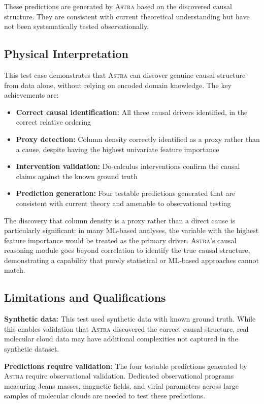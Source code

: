 \documentclass[fleqn,usenatbib]{mnras}
\newcommand{\astra}{\textsc{Astra}\xspace}
\begin{document}
These predictions are generated by \astra based on the discovered causal structure. They are consistent with current theoretical understanding but have not been systematically tested observationally.

\subsection{Physical Interpretation}
\label{sec:tc6:interpretation}

This test case demonstrates that \astra can discover genuine causal structure from data alone, without relying on encoded domain knowledge.
The key achievements are:
\begin{itemize}
  \item \textbf{Correct causal identification:} All three causal drivers identified, in the correct relative ordering
  \item \textbf{Proxy detection:} Column density correctly identified as a proxy rather than a cause, despite having the highest univariate feature importance
  \item \textbf{Intervention validation:} Do-calculus interventions confirm the causal claims against the known ground truth
  \item \textbf{Prediction generation:} Four testable predictions generated that are consistent with current theory and amenable to observational testing
\end{itemize}

The discovery that column density is a proxy rather than a direct cause is particularly significant: in many ML-based analyses, the variable with the highest feature importance would be treated as the primary driver.
\astra's causal reasoning module goes beyond correlation to identify the true causal structure, demonstrating a capability that purely statistical or ML-based approaches cannot match.

\subsection{Limitations and Qualifications}
\label{sec:tc6:limitations}

\textbf{Synthetic data:}
This test used synthetic data with known ground truth.
While this enables validation that \astra discovered the correct causal structure, real molecular cloud data may have additional complexities not captured in the synthetic dataset.

\textbf{Predictions require validation:}
The four testable predictions generated by \astra require observational validation.
Dedicated observational programs measuring Jeans masses, magnetic fields, and virial parameters across large samples of molecular clouds are needed to test these predictions.
\end{document}

